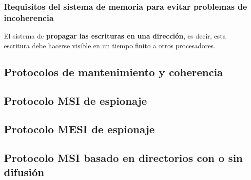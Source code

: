 \subsubsection{Requisitos del sistema de memoria para evitar problemas de incoherencia}

El sistema de \textbf{propagar las escrituras en una dirección}, es decir, esta escritura debe hacerse visible en un tiempo finito a otros procesadores.


\subsection{Protocolos de mantenimiento y coherencia}

\subsection{Protocolo MSI de espionaje}

\subsection{Protocolo MESI de espionaje}

\subsection{Protocolo MSI basado en directorios con o sin difusión}
